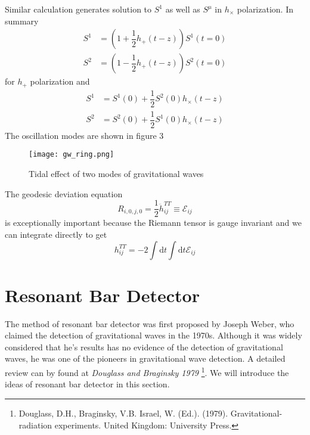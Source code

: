 \documentclass[10pt]{article}
\begin{document}
Similar calculation generates solution to $ S^1 $ as well as $ S^\mu $ in $ h_\times $ polarization. In summary
\begin{equation}\label{eq: geo_deviation_hplus}
\begin{aligned}
S^1&=(1+\dfrac{1}{2} h_+(t-z)) S^1(t=0)\\
S^2&=(1-\dfrac{1}{2} h_+(t-z)) S^2(t=0)
\end{aligned}
\end{equation}
for $ h_+ $ polarization and
\begin{equation}\label{eq: geo_deviation_hcross}
\begin{aligned}
S^1&=S^1(0)+\dfrac{1}{2} S^2(0) h_\times (t-z)\\
S^2&=S^2(0)+\dfrac{1}{2} S^1(0) h_\times (t-z)
\end{aligned}
\end{equation}
The oscillation modes are shown in figure 3
\begin{figure}
	\centering
	\texttt{[image: gw\_ring.png]}
	\caption{Tidal effect of two modes of gravitational waves}
	\label{fig:gwring}
\end{figure}

The geodesic deviation equation
\begin{equation}\label{eq: geo_dev_ij}
R_{i,0,j,0}=\dfrac{1}{2} \ddot{h}^{TT}_{ij} \equiv \mathcal{E}_{ij}
\end{equation}
is exceptionally important because the Riemann tensor is gauge invariant and we can integrate directly to get
\begin{equation}\label{eq: reverse_calculation}
h^{TT}_{ij}=-2 \int\mathrm{d}t \int\mathrm{d}t \mathcal{E}_{ij}
\end{equation} 


\section{Resonant Bar Detector}
The method of resonant bar detector was first proposed by Joseph Weber, who claimed the detection of gravitational waves in the 1970s. Although it was widely considered that he's results has no evidence of the detection of gravitational waves, he was one of the pioneers in gravitational wave detection. A detailed review can by found at \textit{Douglass and Braginsky 1979} \footnote{Douglass, D.H., Braginsky, V.B. Israel, W. (Ed.). (1979). Gravitational-radiation experiments. United Kingdom: University Press.}. We will introduce the ideas of resonant bar detector in this section.
\end{document}
